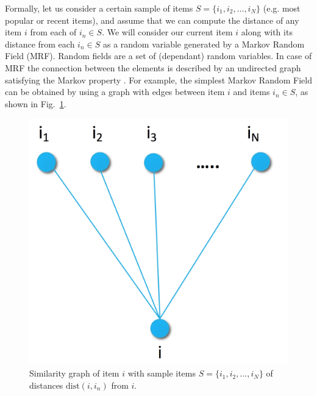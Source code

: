 Formally, let us consider a certain sample of items $S=\{i_1,i_2,\ldots,i_N\}$ (e.g. most popular or recent items), and assume that we can compute the distance of any item $i$ from each of $i_n \in S$. We will consider our current item $i$ along with its distance from each $i_n\in S$ as a random variable generated by a Markov Random Field (MRF). Random fields are a set of (dependant) random variables. In case of MRF the connection between the elements is described by an undirected graph satisfying the Markov property \cite{besag1975statistical}. For example, the simplest Markov Random Field can be obtained by using a graph with edges between item $i$ and items $i_n\in S$, as shown in  Fig.~\ref{fig:pairwise}. 

\begin{figure}
\centerline{
  \includegraphics[scale=.2]{i2i_pair.png}}

\caption[]{Similarity graph of item $i$ with sample items $S=\{i_1,i_2,...,i_{N}\}$ of distances $\mbox{dist}(i,i_n)$ from $i$.}
\label{fig:pairwise}
\end{figure}

